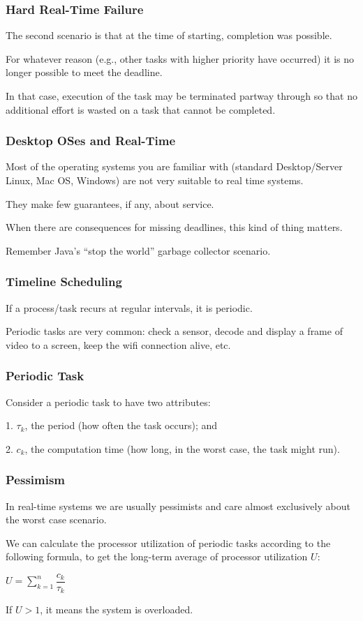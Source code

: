 \begin{frame}
\frametitle{Hard Real-Time Failure}

The second scenario is that at the time of starting, completion was possible. 

For whatever reason (e.g., other tasks with higher priority have occurred) it is no longer possible to meet the deadline. 

In that case, execution of the task may be terminated partway through so that no additional effort is wasted on a task that cannot be completed.


\end{frame}

\begin{frame}
\frametitle{Desktop OSes and Real-Time}

Most of the operating systems you are familiar with (standard Desktop/Server Linux, Mac OS, Windows) are not very suitable to real time systems. 

They make few guarantees, if any, about service. 

When there are consequences for missing deadlines, this kind of thing matters. 

Remember Java's ``stop the world'' garbage collector scenario.

\end{frame}

\begin{frame}
\frametitle{Timeline Scheduling}

If a process/task recurs at regular intervals, it is \alert{periodic}.

Periodic tasks are very common: check a sensor, decode and display a frame of video to a screen, keep the wifi connection alive, etc.

\end{frame}

\begin{frame}
\frametitle{Periodic Task}

Consider a periodic task to have two attributes: 

1. $\tau_{k}$, the period (how often the task occurs); and 

2. $c_{k}$, the computation time (how long, in the worst case, the task might run).

\end{frame}

\begin{frame}
\frametitle{Pessimism}

In real-time systems we are usually pessimists and care almost exclusively about the worst case scenario. 

We can calculate the processor utilization of periodic tasks according to the following formula, to get the long-term average of processor utilization $U$:

\begin{center}
$U = \sum\limits_{k=1}^n\dfrac{c_{k}}{\tau_{k}}$
\end{center}

If $U > 1$, it means the system is overloaded. 

\end{frame}

